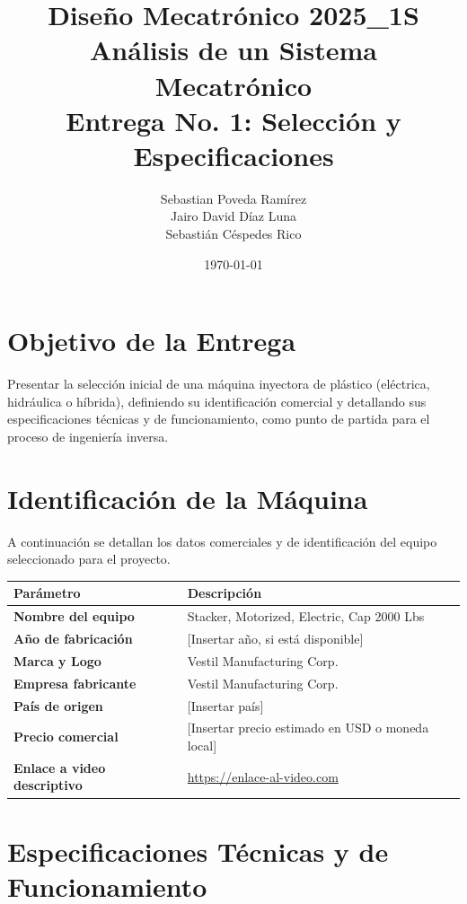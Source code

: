 \documentclass[11pt, a4paper]{article}
\title{\textbf{Diseño Mecatrónico 2025\_1S}\\ \Large Análisis de un Sistema Mecatrónico \\ \vspace{0.5cm} \large \textbf{Entrega No. 1: Selección y Especificaciones}}
\author{
    Sebastian Poveda Ramírez \\ 
    Jairo David Díaz Luna \\ 
    Sebastián Céspedes Rico
}
\date{\today}
\begin{document}
\maketitle
\thispagestyle{empty}

\section*{Objetivo de la Entrega}
Presentar la selección inicial de una máquina inyectora de plástico (eléctrica, hidráulica o híbrida), definiendo su identificación comercial y detallando sus especificaciones técnicas y de funcionamiento, como punto de partida para el proceso de ingeniería inversa.

\vspace{1cm}

\section{Identificación de la Máquina}

A continuación se detallan los datos comerciales y de identificación del equipo seleccionado para el proyecto.

\vspace{0.5cm}
\begin{table}[h!]
    \centering
    \renewcommand{\arraystretch}{1.5}
    \begin{tabularx}{\textwidth}{>{\raggedright\arraybackslash\bfseries}p{5cm} X}
        \toprule
        Parámetro & Descripción \\
        \midrule
        Nombre del equipo & Stacker, Motorized, Electric, Cap 2000 Lbs \\
        Año de fabricación & [Insertar año, si está disponible] \\
        Marca y Logo & Vestil Manufacturing Corp. \\
        Empresa fabricante & Vestil Manufacturing Corp. \\
        País de origen & [Insertar país] \\
        Precio comercial & [Insertar precio estimado en USD o moneda local] \\
        Enlace a video descriptivo & \url{https://enlace-al-video.com} \\
        \bottomrule
    \end{tabularx}
\end{table}

\newpage
\section{Especificaciones Técnicas y de Funcionamiento}
\end{document}
